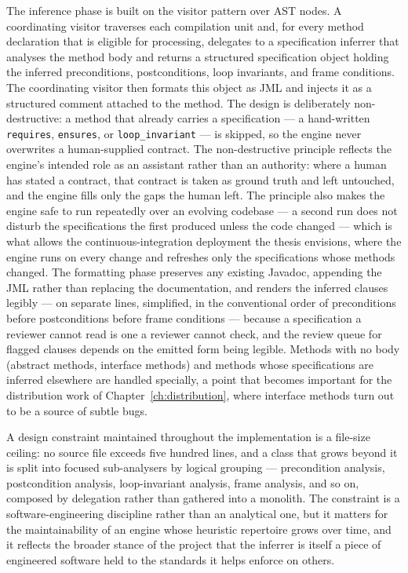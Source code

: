 The inference phase is built on the visitor pattern over AST nodes. A
coordinating visitor traverses each compilation unit and, for every method
declaration that is eligible for processing, delegates to a specification
inferrer that analyses the method body and returns a structured specification
object holding the inferred preconditions, postconditions, loop invariants,
and frame conditions. The coordinating visitor then formats this object as JML
and injects it as a structured comment attached to the method. The design is
deliberately non-destructive: a method that already carries a specification ---
a hand-written \texttt{requires}, \texttt{ensures}, or
\texttt{loop\_invariant} --- is skipped, so the engine never overwrites a
human-supplied contract. The non-destructive principle reflects the engine's
intended role as an assistant rather than an authority: where a human has stated a
contract, that contract is taken as ground truth and left untouched, and the engine
fills only the gaps the human left. The principle also makes the engine safe to run
repeatedly over an evolving codebase --- a second run does not disturb the
specifications the first produced unless the code changed --- which is what allows
the continuous-integration deployment the thesis envisions, where the engine runs
on every change and refreshes only the specifications whose methods changed. The
formatting phase preserves any existing Javadoc, appending the JML rather than
replacing the documentation, and renders the inferred clauses legibly --- on
separate lines, simplified, in the conventional order of preconditions before
postconditions before frame conditions --- because a specification a reviewer
cannot read is one a reviewer cannot check, and the review queue for flagged
clauses depends on the emitted form being legible. Methods with no body (abstract
methods, interface methods) and methods whose specifications are inferred elsewhere
are handled specially, a point that becomes important for the distribution work of
Chapter~\ref{ch:distribution}, where interface methods turn out to be a source
of subtle bugs.

A design constraint maintained throughout the implementation is a file-size
ceiling: no source file exceeds five hundred lines, and a class that grows
beyond it is split into focused sub-analysers by logical grouping ---
precondition analysis, postcondition analysis, loop-invariant analysis, frame
analysis, and so on, composed by delegation rather than gathered into a
monolith. The constraint is a software-engineering discipline rather than an
analytical one, but it matters for the maintainability of an engine whose
heuristic repertoire grows over time, and it reflects the broader stance of
the project that the inferrer is itself a piece of engineered software held to
the standards it helps enforce on others.

